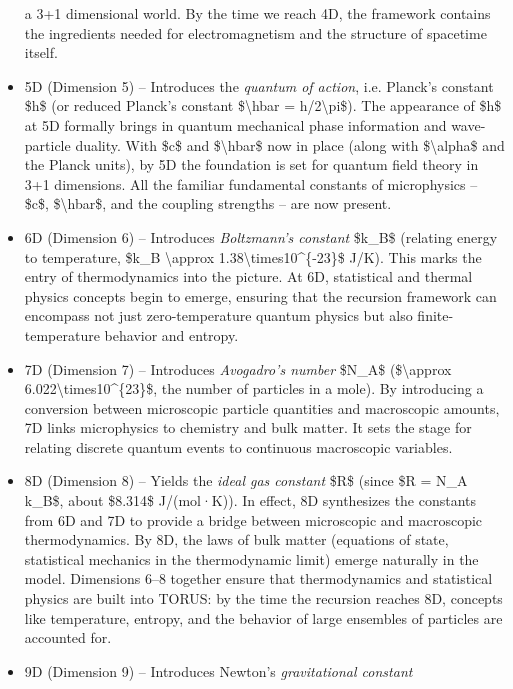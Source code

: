\documentclass[]{article}
\begin{document}
\begin{itemize}
  a 3+1 dimensional world. By the time we reach 4D, the framework
  contains the ingredients needed for electromagnetism and the structure
  of spacetime itself.
\item
  5D (Dimension 5) -- Introduces the \emph{quantum of action}, i.e.
  Planck's constant \$h\$ (or reduced Planck's constant
  \$\textbackslash{}hbar = h/2\textbackslash{}pi\$). The appearance of
  \$h\$ at 5D formally brings in quantum mechanical phase information
  and wave-particle duality. With \$c\$ and \$\textbackslash{}hbar\$ now
  in place (along with \$\textbackslash{}alpha\$ and the Planck units),
  by 5D the foundation is set for quantum field theory in 3+1
  dimensions. All the familiar fundamental constants of microphysics --
  \$c\$, \$\textbackslash{}hbar\$, and the coupling strengths -- are now
  present.
\item
  6D (Dimension 6) -- Introduces \emph{Boltzmann's constant} \$k\_B\$
  (relating energy to temperature, \$k\_B \textbackslash{}approx
  1.38\textbackslash{}times10\^{}\{-23\}\$ J/K). This marks the entry of
  thermodynamics into the picture. At 6D, statistical and thermal
  physics concepts begin to emerge, ensuring that the recursion
  framework can encompass not just zero-temperature quantum physics but
  also finite-temperature behavior and entropy.
\item
  7D (Dimension 7) -- Introduces \emph{Avogadro's number} \$N\_A\$
  (\$\textbackslash{}approx 6.022\textbackslash{}times10\^{}\{23\}\$,
  the number of particles in a mole). By introducing a conversion
  between microscopic particle quantities and macroscopic amounts, 7D
  links microphysics to chemistry and bulk matter. It sets the stage for
  relating discrete quantum events to continuous macroscopic variables.
\item
  8D (Dimension 8) -- Yields the \emph{ideal gas constant} \$R\$ (since
  \$R = N\_A k\_B\$, about \$8.314\$ J/(mol·K)). In effect, 8D
  synthesizes the constants from 6D and 7D to provide a bridge between
  microscopic and macroscopic thermodynamics. By 8D, the laws of bulk
  matter (equations of state, statistical mechanics in the thermodynamic
  limit) emerge naturally in the model. Dimensions 6--8 together ensure
  that thermodynamics and statistical physics are built into TORUS: by
  the time the recursion reaches 8D, concepts like temperature, entropy,
  and the behavior of large ensembles of particles are accounted for.
\item
  9D (Dimension 9) -- Introduces Newton's \emph{gravitational constant}

\end{itemize}
\end{document}
